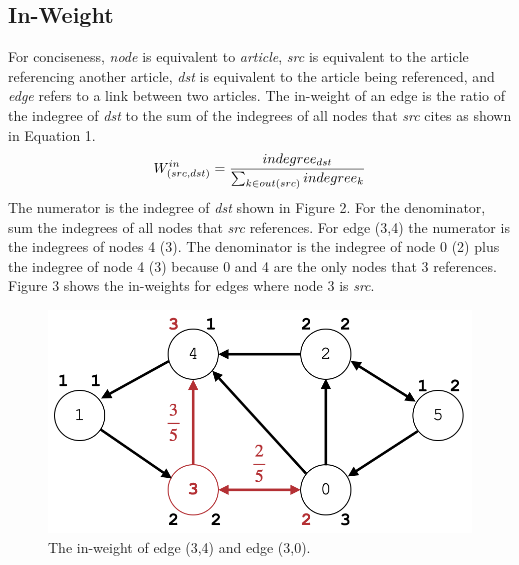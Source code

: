 \documentclass[journal]{IEEEtran}
\begin{document}
\subsection{In-Weight}
For conciseness, \emph{node} is equivalent to \emph{article}, \emph{src} is equivalent to the article referencing another article, \emph{dst} is equivalent to the article being referenced, and \emph{edge} refers to a link between two articles. The in-weight of an edge is the ratio of the indegree of \emph{dst} to the sum of the indegrees of all nodes that \emph{src} cites as shown in Equation 1.
\begin{equation}
\large W^{in}_{(src,dst)}=\frac{indegree_{dst}}{\sum_{k\in out(src)}indegree_{k}}
\end{equation}
The numerator is the indegree of \emph{dst} shown in Figure 2. For the denominator, sum the indegrees of all nodes that \emph{src} references. For edge (3,4) the numerator is the indegrees of nodes 4 (3). The denominator is the indegree of node 0 (2) plus the indegree of node 4 (3) because 0 and 4 are the only nodes that 3 references. Figure 3 shows the in-weights for edges where node 3 is \emph{src}.
\begin{figure}[h!]
\begin{center}\includegraphics[scale=0.2]{3.png}\end{center}
\caption{The in-weight of edge (3,4) and edge (3,0).}
\end{figure}
\end{document}
